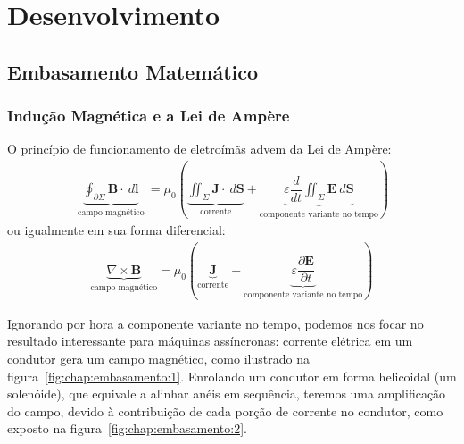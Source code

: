 \documentclass[
        12pt,                           %
        openright,                      %
        twoside,                        %
        a4paper,                        %
        english,                        %
        french,                         %
        spanish,                        %
        brazil                          %
        ]{abntex2}
\begin{document}

\part{Desenvolvimento}
\chapter[Embasamento Matemático]{Embasamento Matemático}\label{chap:embasamento}
\section{Indução Magnética e a Lei de Ampère}
O princípio de funcionamento de eletroímãs advem da Lei de Ampère:
\begin{gather}
  \underbrace{ \oint_{\partial \Sigma} \bm{B} \cdot \: d{\bm{l}} }_\text{ campo magnético } = \mu_0 \left( \underbrace{ \iint_{\Sigma} \bm{J} \cdot \: d{\bm{S}} }_\text{corrente} + \underbrace{ \varepsilon \dfrac{d}{dt} \iint_{\Sigma} \bm{E} \: d{\bm{S}} }_\text{componente variante no tempo}  \right)
\end{gather}
ou igualmente em sua forma diferencial:
\begin{gather}
  \underbrace{\nabla \times \bm{B}}_\text{campo magnético} = \mu_0 \left( \underbrace{\bm{J}}_\text{corrente} + \underbrace{\varepsilon \dfrac{\partial \bm{E}}{\partial t}}_\text{componente variante no tempo} \right) 
\end{gather}

Ignorando por hora a componente variante no tempo, podemos nos focar no resultado
interessante para máquinas assíncronas: corrente elétrica em um condutor gera um
campo magnético, como ilustrado na figura~\ref{fig:chap:embasamento:1}. Enrolando
um condutor em forma helicoidal (um solenóide), que equivale a alinhar anéis em
sequência, teremos uma amplificação do campo, devido à contribuição de cada porção
de corrente no condutor, como exposto na figura~\ref{fig:chap:embasamento:2}.
\end{document}
